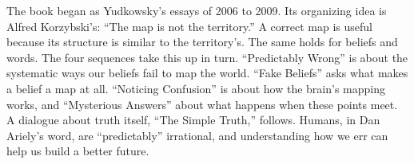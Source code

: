 The book began as Yudkowsky's essays of 2006 to 2009. Its organizing idea is Alfred Korzybski's: ``The map is not the territory.'' A correct map is useful because its structure is similar to the territory's. The same holds for beliefs and words. The four sequences take this up in turn. ``Predictably Wrong'' is about the systematic ways our beliefs fail to map the world. ``Fake Beliefs'' asks what makes a belief a map at all. ``Noticing Confusion'' is about how the brain's mapping works, and ``Mysterious Answers'' about what happens when these points meet. A dialogue about truth itself, ``The Simple Truth,'' follows. Humans, in Dan Ariely's word, are ``predictably'' irrational, and understanding how we err can help us build a better future.
